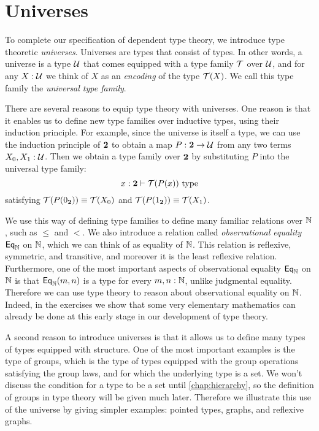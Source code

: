 \section{Universes}

To complete our specification of dependent type theory, we introduce type theoretic \emph{universes}. Universes are types that consist of types. In other words, a universe is a type $\mathcal{U}$ that comes equipped with a type family $\mathcal{T}$ over $\mathcal{U}$, and for any $X:\mathcal{U}$ we think of $X$ as an \emph{encoding} of the type $\mathcal{T}(X)$. We call this type family the \emph{universal type family}.

There are several reasons to equip type theory with universes. One reason is that it enables us to define new type families over inductive types, using their induction principle. For example, since the universe is itself a type, we can use the induction principle of $\mathbf{2}$ to obtain a map $P:\mathbf{2}\to\mathcal{U}$ from any two terms $X_0,X_1:\mathcal{U}$. Then we obtain a type family over $\mathbf{2}$ by substituting $P$ into the universal type family:
\begin{equation*}
  x:\mathbf{2}\vdash \mathcal{T}(P(x))~\mathrm{type}
\end{equation*}
satisfying $\mathcal{T}(P(0_\mathbf{2}))\equiv \mathcal{T}(X_0)$ and $\mathcal{T}(P(1_\mathbf{2}))\equiv \mathcal{T}(X_1)$.

We use this way of defining type families to define many familiar relations over ${\mathbb{N}}$, such as $\leq$ and $<$. We also introduce a relation called \emph{observational equality} $\mathsf{Eq}_{{\mathbb{N}}}$ on ${\mathbb{N}}$, which we can think of as equality of ${\mathbb{N}}$. This relation is reflexive, symmetric, and transitive, and moreover it is the least reflexive relation. Furthermore, one of the most important aspects of observational equality $\mathsf{Eq}_{{\mathbb{N}}}$ on ${\mathbb{N}}$ is that $\mathsf{Eq}_{{\mathbb{N}}}(m,n)$ is a type for every $m,n:{\mathbb{N}}$, unlike judgmental equality. Therefore we can use type theory to reason about observational equality on ${\mathbb{N}}$. Indeed, in the exercises we show that some very elementary mathematics can already be done at this early stage in our development of type theory.

A second reason to introduce universes is that it allows us to define many types of types equipped with structure. One of the most important examples is the type of groups, which is the type of types equipped with the group operations satisfying the group laws, and for which the underlying type is a set. We won't discuss the condition for a type to be a set until \cref{chap:hierarchy}, so the definition of groups in type theory will be given much later. Therefore we illustrate this use of the universe by giving simpler examples: pointed types, graphs, and reflexive graphs.

